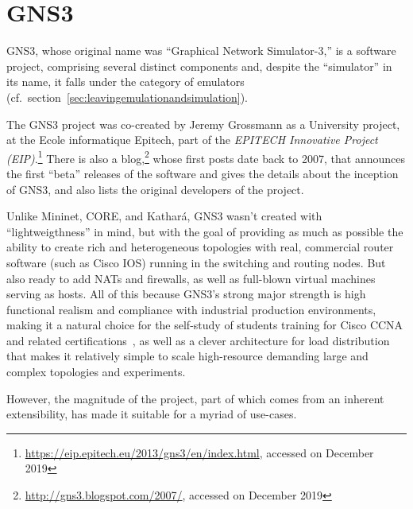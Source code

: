 \section{GNS3}
\label{sec:exemulgns3}

GNS3, whose original name was ``Graphical Network Simulator-3,'' is a software project, comprising several distinct components and, despite the ``simulator'' in its name, it falls under the category of emulators (cf.~section~\ref{sec:leavingemulationandsimulation}).

The GNS3 project was co-created by Jeremy Grossmann as a University project, at the Ecole informatique Epitech, part of the \emph{EPITECH Innovative Project (EIP)}.\footnote{\url{https://eip.epitech.eu/2013/gns3/en/index.html}, accessed on December 2019}
There is also a blog,\footnote{\url{http://gns3.blogspot.com/2007/}, accessed on December 2019} whose first posts date back to 2007, that announces the first ``beta'' releases of the software and gives the details about the inception of GNS3, and also lists the original developers of the project.

Unlike Mininet, CORE, and Kathará, GNS3 wasn't created with ``lightweigthness'' in mind, but with the goal of providing as much as possible the ability to create rich and heterogeneous topologies with real, commercial router software (such as Cisco IOS) running in the switching and routing nodes.
But also ready to add NATs and firewalls, as well as full-blown virtual machines serving as hosts.
All of this because GNS3's strong major strength is high functional realism and compliance with industrial production environments, making it a natural choice for the self-study of students  training for Cisco CCNA and related certifications~\cite{thebookofgns3,gns3netsimguide}, as well as a clever architecture for load distribution that makes it relatively simple to scale high-resource demanding large and complex topologies and experiments.

However, the magnitude of the project, part of which comes from an inherent extensibility, has made it suitable for a myriad of use-cases.

